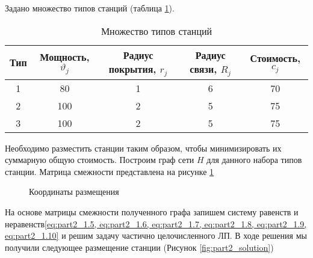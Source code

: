 Задано множество типов станций (таблица \ref{tab:part2_station_types_1}).

\begin{table}
    \centering
    \captionsetup{justification=centering} %
    \caption{Множество типов станций}\label{tab:part2_station_types_1}
    \begin{tabular}{|c|c|c|c|c|}
        \toprule
        Тип & Мощность, $\vartheta_j$ & Радиус покрытия, $r_j$  & Радиус связи, $R_j$ & Стоимость, $c_j$ \\
        \toprule
        1   & 80 & 1 & 6 & 70 \\
        2  & 100 & 2 & 5 & 75 \\
        3  & 100 & 2 & 5 & 75 \\
        \bottomrule
    \end{tabular}
\end{table}

Необходимо разместить станции таким образом, чтобы минимизировать их  суммарную общую стоимость.
Построим граф сети $H$ для данного набора типов станции. Матрица смежности представлена на рисунке \cref{fig:part2_adjacency_matrix}
 
\begin{figure}[ht]
    \caption{Координаты размещения}\label{fig:part2_adjacency_matrix}
\end{figure}



На основе матрицы смежности полученного графа запишем систему равенств и неравенств\cref{eq:part2_1.5, eq:part2_1.6, eq:part2_1.7, eq:part2_1.8, eq:part2_1.9, eq:part2_1.10} и решим задачу частично целочисленного ЛП.
В ходе решения мы получили следующее размещение станции (Рисунок \cref{fig:part2_solution})

